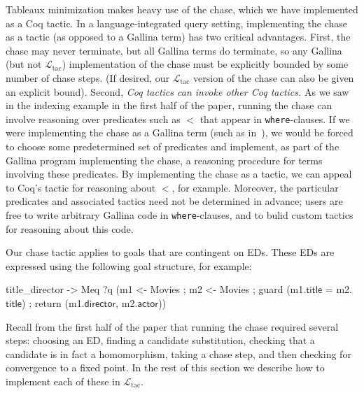 \documentclass[preprint]{sigplanconf}
\newcommand{\ltac}[0]{\ensuremath{\mathcal{L}_{\mathrm{tac}}}}
\begin{document}
Tableaux minimization makes heavy use of the chase, which we have implemented as a Coq tactic.  In a language-integrated query setting, implementing the chase as a tactic (as opposed to a Gallina term) has two critical advantages.  First, the chase may never terminate, but all Gallina terms do terminate, so any Gallina (but not \ltac{}) implementation of the chase must be explicitly bounded by some number of chase steps. (If desired, our \ltac{} version of the chase can also be given an explicit bound). Second, {\it Coq tactics can invoke other Coq tactics.}  As we saw in the indexing example in the first half of the paper, running the chase can involve reasoning over predicates such as $<$ that appear in {\tt where}-clauses.
If we were implementing the chase as a Gallina term (such as in~\cite{coqdb}), we would be forced to choose some predetermined set of predicates and implement, as part of the Gallina program implementing the chase, a reasoning procedure for terms involving these predicates.  By implementing the chase as a tactic, we can appeal to Coq's  tactic for reasoning about $<$, for example.  Moreover, the particular predicates and associated tactics need not be determined in advance; users are free to write arbitrary Gallina code in {\tt where}-clauses, and to bulid custom tactics for reasoning about this code.


Our chase tactic applies to goals that are contingent on EDs.
These EDs are expressed using the following goal structure, for example:
\begin{coq}
title_director ->
Meq ?q
    (m1 <- Movies ; m2 <- Movies ;
     guard (m1.$\textsf{title}$ = m2.$\textsf{title}$) ;
     return (m1.$\textsf{director}$, m2.$\textsf{actor}$))
\end{coq}

Recall from the first half of the paper that running the chase required several steps: choosing an ED, finding a candidate substitution, checking that a candidate is in fact a homomorphism, taking a chase step, and then checking for convergence to a fixed point.
In the rest of this section we describe how to implement each of these in \ltac{}.

\end{document}
